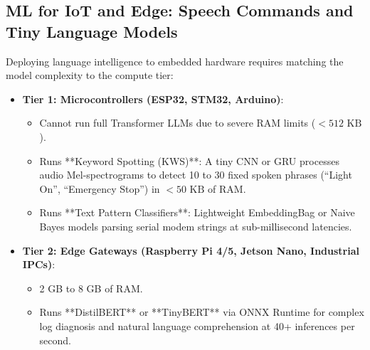 \subsection{ML for IoT and Edge: Speech Commands and Tiny Language Models}\label{subsec:iot_nlp}

\begin{iotbox}
Deploying language intelligence to embedded hardware requires matching the model complexity to the compute tier:
\begin{itemize}
    \item \textbf{Tier 1: Microcontrollers (ESP32, STM32, Arduino)}:
    \begin{itemize}
        \item Cannot run full Transformer LLMs due to severe RAM limits ($<512\text{ KB}$).
        \item Runs **Keyword Spotting (KWS)**: A tiny CNN or GRU processes audio Mel-spectrograms to detect 10 to 30 fixed spoken phrases (``Light On'', ``Emergency Stop'') in $<50\text{ KB}$ of RAM.
        \item Runs **Text Pattern Classifiers**: Lightweight EmbeddingBag or Naive Bayes models parsing serial modem strings at sub-millisecond latencies.
    \end{itemize}
    \item \textbf{Tier 2: Edge Gateways (Raspberry Pi 4/5, Jetson Nano, Industrial IPCs)}:
    \begin{itemize}
        \item 2 GB to 8 GB of RAM.
        \item Runs **DistilBERT** or **TinyBERT** via ONNX Runtime for complex log diagnosis and natural language comprehension at 40+ inferences per second.
    \end{itemize}
\end{itemize}
\end{iotbox}

